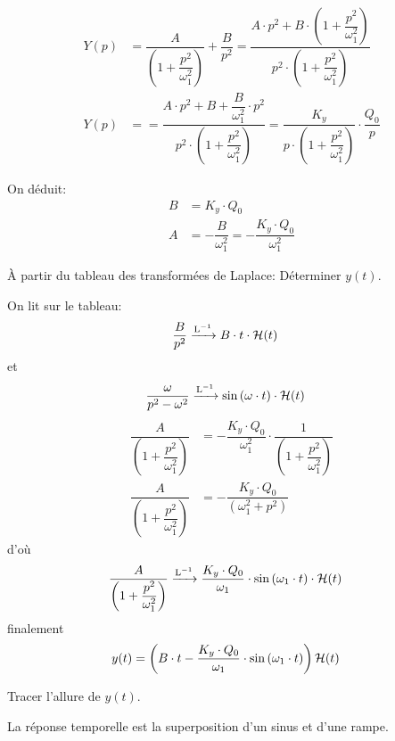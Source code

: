 \begin{Exo}[name={Devoir},title={Système de pendulation},origin={Adapté de Centrale MP 2000},label={exo:CentralePendulation}]
\begin{Cor}
\begin{multicols}{2}
\begin{align*}
Y(p)&=\dfrac{A}{ \left(1+\dfrac{p^2}{\omega_1^2}\right)} +\dfrac{B}{p^2}=\dfrac{A\cdot p^2+B\cdot\left(1+\dfrac{p^2}{\omega_1^2}\right)}{p^2\cdot \left(1+\dfrac{p^2}{\omega_1^2}\right)}\\
Y(p)&==\dfrac{A\cdot p^2+B+\dfrac{B}{\omega_1^2}\cdot p^2}{p^2\cdot \left(1+\dfrac{p^2}{\omega_1^2}\right)}=\dfrac{K_y}{p\cdot \left(1+\dfrac{p^2}{\omega_1^2}\right)}\cdot \dfrac{Q_0}{p}
\end{align*}

On déduit:
\begin{align*}
B&=K_y\cdot Q_0\\
A&=-\dfrac{B}{\omega_1^2}=-\dfrac{K_y\cdot Q_0}{\omega_1^2}
\end{align*}


\qst À partir du tableau des transformées de Laplace:
\sq Déterminer $y(t)$.  

On lit sur le tableau:
\begin{align*}
\dfrac{B}{p^2} &\xrightarrow{\mathrm{L}^{-1}} B\cdot t\cdot \mathcal {H}(t)
\end{align*}
et
\begin{align*}
\dfrac{\omega}{p^2 -\omega^2} &\xrightarrow{\mathrm{L}^{-1}} \sin\left(\omega\cdot t\right)\cdot \mathcal {H}(t)
\end{align*}
\begin{align*}
\dfrac{A}{ \left(1+\dfrac{p^2}{\omega_1^2}\right)}& = -\dfrac{K_y\cdot Q_0}{\omega_1^2}\cdot \dfrac{1}{ \left(1+\dfrac{p^2}{\omega_1^2}\right)}\\
\dfrac{A}{ \left(1+\dfrac{p^2}{\omega_1^2}\right)}& = - \dfrac{K_y\cdot Q_0}{ \left(\omega_1^2+{p^2}\right)}
\end{align*}
d'où
\begin{align*}
\dfrac{A}{ \left(1+\dfrac{p^2}{\omega_1^2}\right)}&\xrightarrow{\mathrm{L}^{-1}} \dfrac{K_y\cdot Q_0}{\omega_1}\cdot \sin\left(\omega_1\cdot t\right)\cdot \mathcal {H}(t)
\end{align*}
finalement
\begin{align*}
y(t)&=\left(B\cdot t-\dfrac{K_y\cdot Q_0}{\omega_1}\cdot \sin\left(\omega_1\cdot t\right)\right)\mathcal {H}(t)
\end{align*}


\sq Tracer l'allure de $y(t)$.

La réponse temporelle est la superposition d'un sinus et d'une rampe.


\end{multicols}
\end{Cor}
\end{Exo}
